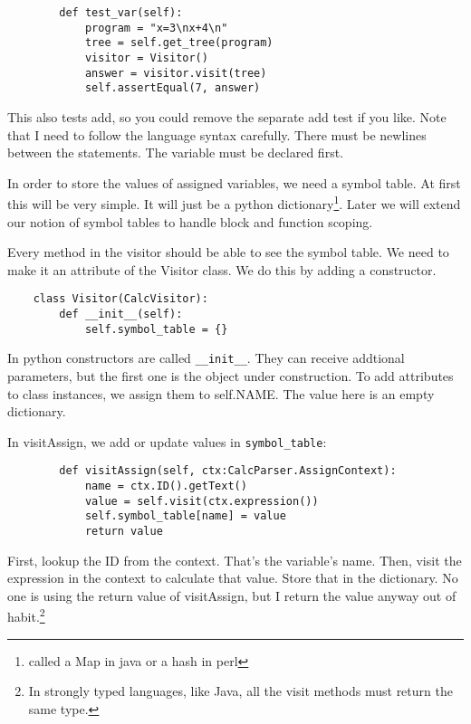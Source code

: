 {\footnotesize
\begin{verbatim}
        def test_var(self):
            program = "x=3\nx+4\n"
            tree = self.get_tree(program)
            visitor = Visitor()
            answer = visitor.visit(tree)
            self.assertEqual(7, answer)
\end{verbatim}
}

This also tests add, so you could remove the separate add test if you like.
Note that I need to follow the language syntax carefully. There must
be newlines between the statements. The variable must be declared first.

In order to store the values of assigned variables, we need a symbol
table. At first this will be very simple. It will just be a python
dictionary\footnote{called a Map in java or a hash in perl}. Later
we will extend our notion of symbol tables to handle block and function
scoping.

Every method in the visitor should be able to see the symbol table.
We need to make it an attribute of the Visitor class. We do this by adding
a constructor.

{\footnotesize
\begin{verbatim}
    class Visitor(CalcVisitor):
        def __init__(self):
            self.symbol_table = {}
\end{verbatim}
}

In python constructors are called \verb+__init__+. They can receive
addtional parameters, but the first one is the object under construction.
To add attributes to class instances, we assign them to self.NAME.
The value here is an empty dictionary.

In visitAssign, we add or update values in \verb+symbol_table+:

{\footnotesize
\begin{verbatim}
        def visitAssign(self, ctx:CalcParser.AssignContext):
            name = ctx.ID().getText()
            value = self.visit(ctx.expression())
            self.symbol_table[name] = value
            return value
\end{verbatim}
}

First, lookup the ID from the context. That's the variable's name.
Then, visit the expression in the context to calculate that value.
Store that in the dictionary. No one is using the return value of
visitAssign, but I return the value anyway out of
habit.\footnote{In strongly typed languages, like Java, all the
visit methods must return the same type.}

